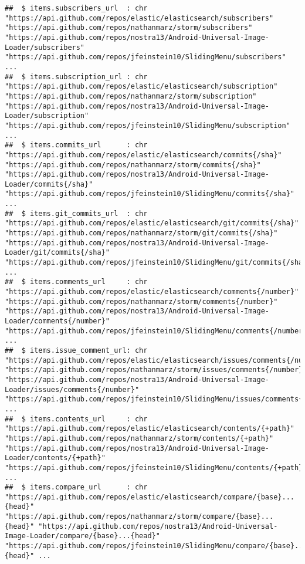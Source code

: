 \documentclass{article}\usepackage[]{graphicx}\usepackage[]{color}
\makeatletter
\newenvironment{kframe}{%
 \def\at@end@of@kframe{}%
 \ifinner\ifhmode%
  \def\at@end@of@kframe{\end{minipage}}%
  \begin{minipage}{\columnwidth}%
 \fi\fi%
 \def\FrameCommand##1{\hskip\@totalleftmargin \hskip-\fboxsep
 \colorbox{shadecolor}{##1}\hskip-\fboxsep
     \hskip-\linewidth \hskip-\@totalleftmargin \hskip\columnwidth}%
 \MakeFramed {\advance\hsize-\width
   \@totalleftmargin\z@ \linewidth\hsize
   \@setminipage}}%
 {\par\unskip\endMakeFramed%
 \at@end@of@kframe}
\newenvironment{knitrout}{}{} %
\makeatother
\begin{document}
\begin{knitrout}
\begin{kframe}
\begin{verbatim}
##  $ items.subscribers_url  : chr  "https://api.github.com/repos/elastic/elasticsearch/subscribers" "https://api.github.com/repos/nathanmarz/storm/subscribers" "https://api.github.com/repos/nostra13/Android-Universal-Image-Loader/subscribers" "https://api.github.com/repos/jfeinstein10/SlidingMenu/subscribers" ...
##  $ items.subscription_url : chr  "https://api.github.com/repos/elastic/elasticsearch/subscription" "https://api.github.com/repos/nathanmarz/storm/subscription" "https://api.github.com/repos/nostra13/Android-Universal-Image-Loader/subscription" "https://api.github.com/repos/jfeinstein10/SlidingMenu/subscription" ...
##  $ items.commits_url      : chr  "https://api.github.com/repos/elastic/elasticsearch/commits{/sha}" "https://api.github.com/repos/nathanmarz/storm/commits{/sha}" "https://api.github.com/repos/nostra13/Android-Universal-Image-Loader/commits{/sha}" "https://api.github.com/repos/jfeinstein10/SlidingMenu/commits{/sha}" ...
##  $ items.git_commits_url  : chr  "https://api.github.com/repos/elastic/elasticsearch/git/commits{/sha}" "https://api.github.com/repos/nathanmarz/storm/git/commits{/sha}" "https://api.github.com/repos/nostra13/Android-Universal-Image-Loader/git/commits{/sha}" "https://api.github.com/repos/jfeinstein10/SlidingMenu/git/commits{/sha}" ...
##  $ items.comments_url     : chr  "https://api.github.com/repos/elastic/elasticsearch/comments{/number}" "https://api.github.com/repos/nathanmarz/storm/comments{/number}" "https://api.github.com/repos/nostra13/Android-Universal-Image-Loader/comments{/number}" "https://api.github.com/repos/jfeinstein10/SlidingMenu/comments{/number}" ...
##  $ items.issue_comment_url: chr  "https://api.github.com/repos/elastic/elasticsearch/issues/comments{/number}" "https://api.github.com/repos/nathanmarz/storm/issues/comments{/number}" "https://api.github.com/repos/nostra13/Android-Universal-Image-Loader/issues/comments{/number}" "https://api.github.com/repos/jfeinstein10/SlidingMenu/issues/comments{/number}" ...
##  $ items.contents_url     : chr  "https://api.github.com/repos/elastic/elasticsearch/contents/{+path}" "https://api.github.com/repos/nathanmarz/storm/contents/{+path}" "https://api.github.com/repos/nostra13/Android-Universal-Image-Loader/contents/{+path}" "https://api.github.com/repos/jfeinstein10/SlidingMenu/contents/{+path}" ...
##  $ items.compare_url      : chr  "https://api.github.com/repos/elastic/elasticsearch/compare/{base}...{head}" "https://api.github.com/repos/nathanmarz/storm/compare/{base}...{head}" "https://api.github.com/repos/nostra13/Android-Universal-Image-Loader/compare/{base}...{head}" "https://api.github.com/repos/jfeinstein10/SlidingMenu/compare/{base}...{head}" ...

\end{verbatim}
\end{kframe}
\end{knitrout}
\end{document}
